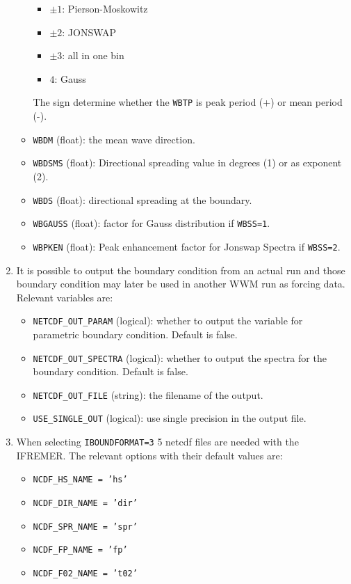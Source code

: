 \documentclass[12pt]{amsart}
\begin{document}
\begin{enumerate}
\begin{itemize}
    \begin{itemize}
    \item $\pm 1$: Pierson-Moskowitz
    \item $\pm 2$: JONSWAP
    \item $\pm 3$: all in one bin
    \item $4$: Gauss
    \end{itemize}
    The sign determine whether the {\tt WBTP} is peak period (+) or mean period (-).
  \item {\tt WBDM} (float): the mean wave direction.
  \item {\tt WBDSMS} (float): Directional spreading value in degrees (1) or as exponent (2).
  \item {\tt WBDS} (float): directional spreading at the boundary.
  \item {\tt WBGAUSS} (float): factor for Gauss distribution if {\tt WBSS=1}.
  \item {\tt WBPKEN} (float):  Peak enhancement factor for Jonswap Spectra if {\tt WBSS=2}.
  \end{itemize}
\item It is possible to output the boundary condition from an actual run and those boundary condition may later be used in another WWM run as forcing data. Relevant variables are:
  \begin{itemize}
  \item {\tt NETCDF\_OUT\_PARAM} (logical): whether to output the variable for parametric boundary condition. Default is false.
  \item {\tt NETCDF\_OUT\_SPECTRA} (logical): whether to output the spectra for the boundary condition. Default is false.
  \item {\tt NETCDF\_OUT\_FILE} (string): the filename of the output.
  \item {\tt USE\_SINGLE\_OUT} (logical): use single precision in the output file.
  \end{itemize}
\item When selecting {\tt IBOUNDFORMAT=3} 5 netcdf files are needed with the IFREMER. The relevant options with their default values are:
  \begin{itemize}
  \item {\tt NCDF\_HS\_NAME = 'hs'}
  \item {\tt NCDF\_DIR\_NAME  = 'dir'}
  \item {\tt NCDF\_SPR\_NAME  = 'spr'}
  \item {\tt NCDF\_FP\_NAME   = 'fp'}
  \item {\tt NCDF\_F02\_NAME  = 't02'}

\end{itemize}
\end{enumerate}
\end{document}
